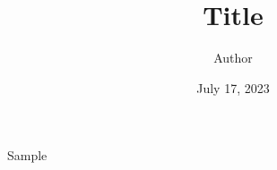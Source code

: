 \documentclass{beamer}
\title[]{Title}
\author{Author}
\date{July 17, 2023}
\theoremstyle{plain}
\begin{document}
\begin{frame}
\titlepage
\end{frame}

\usebackgroundtemplate{ }

\begin{frame}{Sample}
 

\end{frame}
\end{document}
